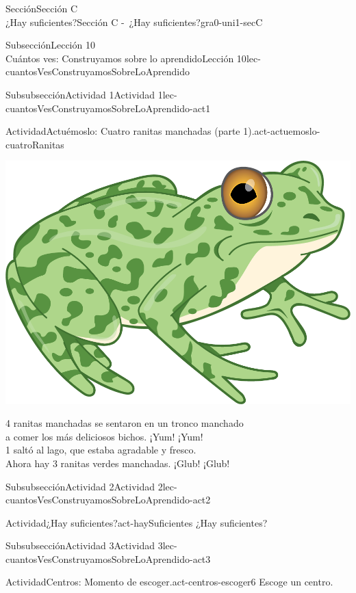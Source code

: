 \begin{sectionptx}{Sección}{{\Large Sección C\\}¿Hay suficientes?}{}{Sección C -~¿Hay suficientes?}{}{}{gra0-uni1-secC}
\begin{subsectionptx}{Subsección}{{\normalsize Lección 10\\[-0.05cm]}Cuántos ves: Construyamos sobre lo aprendido}{}{Lección 10}{}{}{lec-cuantosVesConstruyamosSobreLoAprendido}
\begin{subsubsectionptx}{Subsubsección}{Actividad 1}{}{Actividad 1}{}{}{lec-cuantosVesConstruyamosSobreLoAprendido-act1}
\begin{activity}{Actividad}{Actuémoslo: Cuatro ranitas manchadas (parte 1).}{act-actuemoslo-cuatroRanitas}
\begin{image}{0.275}{0.45}{0.275}{}
\includegraphics[max width=\linewidth, center]{external/png-source/RANA-VERDE.png}
\end{image}%
%
\par
\small
4 ranitas manchadas se sentaron en un tronco manchado\\
 a comer los más deliciosos bichos. ¡Yum! ¡Yum!\\
 1 saltó al lago, que estaba agradable y fresco.\\
 Ahora hay 3 ranitas verdes manchadas. ¡Glub! ¡Glub!%
\end{activity}%
\end{subsubsectionptx}
%
%
\typeout{************************************************}
\typeout{************************************************}
%
\begin{subsubsectionptx}{Subsubsección}{Actividad 2}{}{Actividad 2}{}{}{lec-cuantosVesConstruyamosSobreLoAprendido-act2}
\begin{activity}{Actividad}{¿Hay suficientes?}{act-haySuficientes}%
¿Hay suficientes?%
\end{activity}%
\end{subsubsectionptx}
%
%
\typeout{************************************************}
\typeout{************************************************}
%
\clearpage
\begin{subsubsectionptx}{Subsubsección}{Actividad 3}{}{Actividad 3}{}{}{lec-cuantosVesConstruyamosSobreLoAprendido-act3}
\begin{activity}{Actividad}{Centros: Momento de escoger.}{act-centros-escoger6}%
Escoge un centro.%
\begin{sidebyside}{2}{0.025}{0.025}{0.05}%

\end{sidebyside}
\end{activity}
\end{subsubsectionptx}
\end{subsectionptx}
\end{sectionptx}
